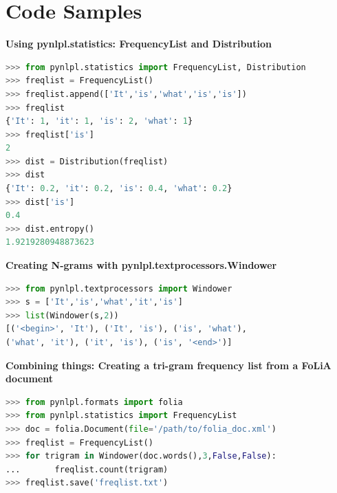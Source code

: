\documentclass[compress]{beamer}
\begin{document}
\section{Code Samples}    
    
\begin{frame}[fragile]
\textbf{Using pynlpl.statistics: FrequencyList and Distribution}

\begin{lstlisting}[language=python]
>>> from pynlpl.statistics import FrequencyList, Distribution
>>> freqlist = FrequencyList()
>>> freqlist.append(['It','is','what','is','is'])
>>> freqlist
{'It': 1, 'it': 1, 'is': 2, 'what': 1}
>>> freqlist['is']
2
>>> dist = Distribution(freqlist)
>>> dist
{'It': 0.2, 'it': 0.2, 'is': 0.4, 'what': 0.2}
>>> dist['is']
0.4
>>> dist.entropy()
1.9219280948873623
\end{lstlisting}

\end{frame}




\begin{frame}[fragile]

\textbf{Creating N-grams with pynlpl.textprocessors.Windower}

\begin{lstlisting}[language=python]
>>> from pynlpl.textprocessors import Windower
>>> s = ['It','is','what','it','is']
>>> list(Windower(s,2))
[('<begin>', 'It'), ('It', 'is'), ('is', 'what'), 
('what', 'it'), ('it', 'is'), ('is', '<end>')]
\end{lstlisting}


\end{frame}
        



\begin{frame}[fragile]

\textbf{Combining things: Creating a tri-gram frequency list from a FoLiA document} 

\begin{lstlisting}[language=python]
>>> from pynlpl.formats import folia
>>> from pynlpl.statistics import FrequencyList
>>> doc = folia.Document(file='/path/to/folia_doc.xml')
>>> freqlist = FrequencyList()
>>> for trigram in Windower(doc.words(),3,False,False):
...       freqlist.count(trigram)
>>> freqlist.save('freqlist.txt')
\end{lstlisting}

\end{frame}
    
\end{document}
